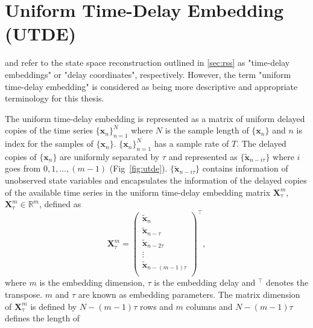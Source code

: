 \section{Uniform Time-Delay Embedding (UTDE)}\label{sec:utimedelayembedding}
\cite{frank2010} and \cite{sama2013} refer to the state space reconstruction 
outlined in \ref{sec:rss} as "time-delay embeddings" or "delay coordinates", 
respectively. However, the term "uniform time-delay embedding" 
is considered as being more descriptive and appropriate terminology 
for this thesis.

The uniform time-delay embedding is represented as a matrix of uniform 
delayed copies of the time series $\{ \boldsymbol{x}_n \}_{n=1}^N$ where $N$ 
is the sample length of $\{ \boldsymbol{x}_n \}$ and $n$ is index for the 
samples of $\{ \boldsymbol{x}_n \}$. $\{ \boldsymbol{x}_n \}_{n=1}^N$ has a 
sample rate of $T$. The delayed copies of $\{ \boldsymbol{x}_n \}$ are 
uniformly separated by $\tau$ and represented as 
$\{\boldsymbol{ \tilde{x} }_{n- i\tau} \}$ where $i$ goes from 
$0,1, \dots, (m-1)$ (Fig~\ref{fig:utde}).
$\{\boldsymbol{ \tilde{x} }_{n- i\tau} \}$ contains information of unobserved 
state variables and encapsulates the information of the delayed copies of 
the available time series in the uniform time-delay embedding matrix 
$\boldsymbol{X}^{m}_{\tau}$, $\boldsymbol{X}^{m}_{\tau} \in \mathbb{R}^m$, 
defined as
\begin{equation}\label{eq:tde}
\boldsymbol{X}^{m}_{\tau}  =
\begin{pmatrix}
\boldsymbol{ \tilde{x} }_n \\
\boldsymbol{ \tilde{x} }_{n-\tau} \\
\boldsymbol{ \tilde{x} }_{n-2\tau} \\
\vdots \\
\boldsymbol{ \tilde{x} }_{n- (m-1) \tau} \\
\end{pmatrix}^\intercal, 
\end{equation}
where $m$ is the embedding dimension, $\tau$ is the embedding delay and
$ ^\intercal$ denotes the transpose. $m$ and $\tau$ are known as embedding 
parameters.
The matrix dimension of $ \boldsymbol{X}_{\tau}^{m} $ is defined by
$N-(m-1)\tau$ rows and $m$ columns and $N-(m-1)\tau$ defines the length of 

